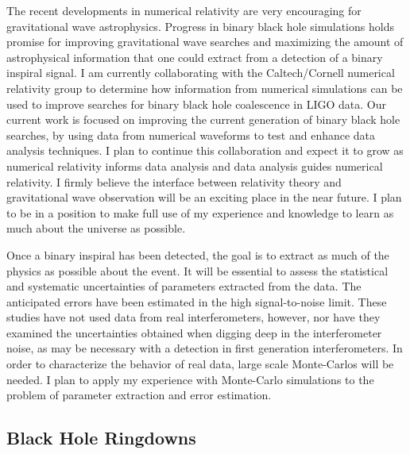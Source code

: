 The recent developments in numerical relativity are very encouraging for
gravitational wave
astrophysics\cite{Pretorius:2005gq,Campanelli:2005dd,Baker:2006yw}. Progress
in binary black hole simulations holds promise for improving gravitational
wave searches and maximizing the amount of astrophysical information that one
could extract from a detection of a binary inspiral signal. I am currently
collaborating with the Caltech/Cornell numerical relativity group to determine
how information from numerical simulations can be used to improve searches for
binary black hole coalescence in LIGO data. Our current work is focused on
improving the current generation of binary black hole searches, by using data
from numerical waveforms to test and enhance data analysis techniques. I plan
to continue this collaboration and expect it to grow as numerical relativity
informs data analysis and data analysis guides numerical relativity. I firmly
believe the interface between relativity theory and gravitational wave
observation will be an exciting place in the near future. I plan to be in
a position to make full use of my experience and knowledge to learn as much
about the universe as possible.

Once a binary inspiral has been detected, the goal is to extract as much of
the physics as possible about the event. It will be essential to assess the
statistical and systematic uncertainties of parameters extracted from the
data. The anticipated errors have been estimated in the high signal-to-noise
limit\cite{Finn:1993xs,Chernoff:1993th,Cutler:1994}. These studies have not
used data from real interferometers, however, nor have they examined the
uncertainties obtained when digging deep in the interferometer noise, as may
be necessary with a detection in first generation interferometers. In order to
characterize the behavior of real data, large scale Monte-Carlos will be
needed. I plan to apply my experience with Monte-Carlo simulations to the
problem of parameter extraction and error estimation.

\subsection{Black Hole Ringdowns}

